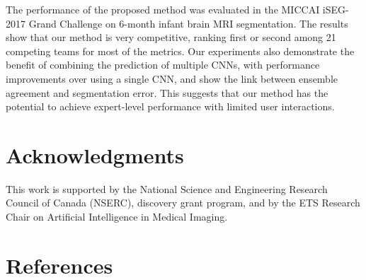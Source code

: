 \documentclass[twoside,espcrc2]{elsarticle}
\begin{document}
The performance of the proposed method was evaluated in the MICCAI iSEG-2017 Grand Challenge on 6-month infant brain MRI segmentation. The results show that our method is very competitive, ranking first or second among 21 competing teams for most of the metrics. Our experiments also demonstrate the benefit of combining the prediction of multiple CNNs, with performance improvements over using a single CNN, and show the link between ensemble agreement and segmentation error. This suggests that our method has the potential to achieve expert-level performance with limited user interactions. 


\section*{Acknowledgments}

This work is supported by the National Science and Engineering Research Council of Canada (NSERC), discovery grant program, and by the ETS Research Chair on Artificial Intelligence in Medical Imaging.

\section*{References}
\end{document}
